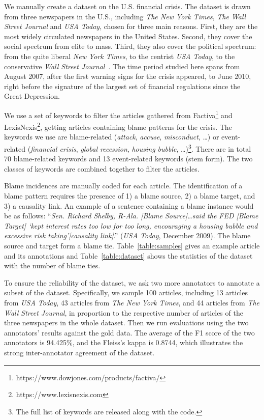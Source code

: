 \documentclass[letterpaper]{article} %
\begin{document}
We manually create a dataset on the U.S. financial crisis. The dataset is drawn from three newspapers in the U.S., including {\it The New York Times}, {\it The Wall Street Journal} and {\it USA Today}, chosen for three main reasons. First, they are the most widely circulated newspapers in the United States. Second, they cover the social spectrum from elite to mass. Third, they also cover the political spectrum: from the quite liberal {\it New York Times}, to the centrist {\it USA Today}, to the conservative {\it Wall Street Journal}~\cite{gentzkow2010drives,groseclose2005measure}. The time period studied here spans from August 2007, after the first warning signs for the crisis appeared, to June 2010, right before the signature of the largest set of financial regulations since the Great Depression.

We use a set of keywords to filter the articles gathered from Factiva\footnote{https://www.dowjones.com/products/factiva/} and LexisNexis\footnote{https://www.lexisnexis.com}, getting articles containing blame patterns for the crisis. The keywords we use are blame-related ({\it attack}, {\it accuse}, {\it misconduct}, \ldots) or event-related ({\it financial crisis}, {\it global recession}, {\it housing bubble}, \ldots)\footnote{The full list of keywords are released along with the code.}. There are in total 70 blame-related keywords and 13 event-related keywords (stem form). The two classes of keywords are combined together to filter the articles.

Blame incidences are manually coded for each article. The identification of a blame pattern requires the presence of 1) a blame source, 2) a blame target, and 3) a causality link. An example of a sentence containing a blame instance would be as follows: ``{\it Sen. Richard Shelby, R-Ala. [Blame Source]\ldots said the FED [Blame Target] `kept interest rates too low for too long, encouraging a housing bubble and excessive risk taking'[causality link]}.'' ({\it USA Today}, December 2009). The blame source and target form a blame tie. Table~\ref{table:samples} gives an example article and its annotations and Table~\ref{table:dataset} shows the statistics of the dataset with the number of blame ties.

To ensure the reliability of the dataset, we ask two more annotators to annotate a subset of the dataset. Specifically, we sample 100 articles, including 13 articles from {\it USA Today}, 43 articles from {\it The New York Times}, and 44 articles from {\it The Wall Street Journal}, in proportion to the respective number of articles of the three newspapers in the whole dataset. Then we run evaluations using the two annotators' results against the gold data. The average of the F1 score of the two annotators is 94.425\%, and the Fleiss's kappa is 0.8744, which illustrates the strong inter-annotator agreement of the dataset.
\end{document}
